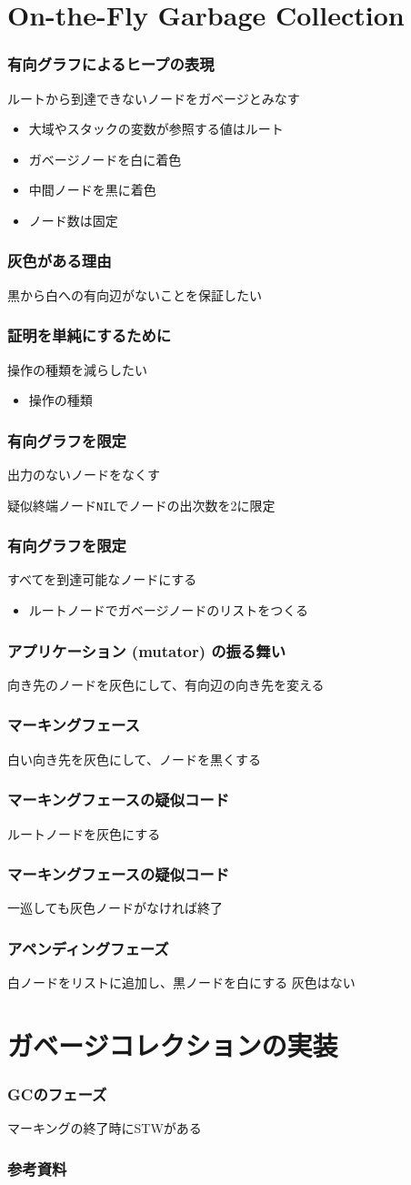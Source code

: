 \documentclass[unicode, 14pt, aspectratio=169]{beamer}
\begin{document}
\section{On-the-Fly Garbage Collection}
\begin{frame}
  \frametitle{有向グラフによるヒープの表現}
  {\large ルートから到達できないノードをガベージとみなす}
  \begin{itemize}
  \item 大域やスタックの変数が参照する値はルート
  \item ガベージノードを白に着色
  \item 中間ノードを黒に着色
  \item ノード数は固定
  \end{itemize}
\end{frame}
\begin{frame}
  \frametitle{灰色がある理由}
  {\large 黒から白への有向辺がないことを保証したい}
\end{frame}
\begin{frame}
  \frametitle{証明を単純にするために}
  {\large 操作の種類を減らしたい}
  \begin{itemize}
    \item 操作の種類
  \end{itemize}
\end{frame}
\begin{frame}
  \frametitle{有向グラフを限定}
  {\large 出力のないノードをなくす}
  \par
  疑似終端ノード\texttt{NIL}でノードの出次数を2に限定
\end{frame}
\begin{frame}
  \frametitle{有向グラフを限定}
  {\large すべてを到達可能なノードにする}
  \begin{itemize}
  \item ルートノードでガベージノードのリストをつくる
  \end{itemize}
\end{frame}
\begin{frame}
  \frametitle{アプリケーション (mutator) の振る舞い}
  {\large 向き先のノードを灰色にして、有向辺の向き先を変える}
\end{frame}
\begin{frame}
  \frametitle{マーキングフェース}
  {\large 白い向き先を灰色にして、ノードを黒くする}
\end{frame}
\begin{frame}
  \frametitle{マーキングフェースの疑似コード}
  {\large ルートノードを灰色にする}
\end{frame}
\begin{frame}
  \frametitle{マーキングフェースの疑似コード}
  {\large 一巡しても灰色ノードがなければ終了}
\end{frame}
\begin{frame}
  \frametitle{アペンディングフェーズ}
  {\large 白ノードをリストに追加し、黒ノードを白にする}
  灰色はない
\end{frame}
\section{ガベージコレクションの実装}
\begin{frame}
  \frametitle{GCのフェーズ}
  {\large マーキングの終了時にSTWがある}
\end{frame}
\begin{frame}[allowframebreaks,t]
  \frametitle{参考資料}
  \printbibliography
  \nocite{*}
\end{frame}
\end{document}
